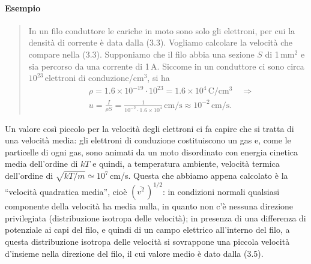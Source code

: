 \paragraph{Esempio}
\begin{quote}
  In un filo conduttore le cariche in moto sono solo gli elettroni, per cui la
  densit\`a di corrente \`e data dalla (3.3). Vogliamo calcolare la velocit\`a
  che compare nella (3.3). Supponiamo che il filo abbia una sezione $S$ di
  1\,mm$^2$ e sia percorso da una corrente di 1\,A. Siccome in un conduttore ci
  sono circa $10^{23}$\,elettroni di conduzione/cm$^3$, si ha
  \begin{equation}
    \begin{aligned}
      &\rho=1.6\times10^{-19}\cdot10^{23}=1.6\times10^4\,\mathrm{C/cm^3}
      \quad\Rightarrow\\
      &u=\frac{I}{\rho S}=\frac{1}{10^{-2}\cdot1.6\times10^4}\,\mathrm{cm/s}
      \approx10^{-2}\,\mathrm{cm/s}.
    \end{aligned}
    \tag{3.5}
  \end{equation}
\end{quote}
Un valore cos\`i piccolo per la velocit\`a degli elettroni ci fa capire che si
tratta di una velocit\`a media: gli elettroni di conduzione costituiscono un gas
e, come le particelle di ogni gas, sono animati da un moto disordinato con
energia cinetica media dell'ordine di $kT$ e quindi, a temperatura ambiente,
velocit\`a termica dell'ordine di $\sqrt{kT/m}\simeq10^7$\,cm/s. Questa che
abbiamo appena calcolato \`e la ``velocit\`a quadratica media'', cio\`e
$(\overline{v^2}\,)^{1/2}$: in condizioni normali qualsiasi componente della
velocit\`a ha media nulla, in quanto non c'\`e nessuna direzione privilegiata
(distribuzione isotropa delle velocit\`a); in presenza di una differenza di
potenziale ai capi del filo, e quindi di un campo elettrico all'interno del
filo, a questa distribuzione isotropa delle velocit\`a si sovrappone una piccola
velocit\`a d'insieme nella direzione del filo, il cui valore medio \`e dato
dalla (3.5).

